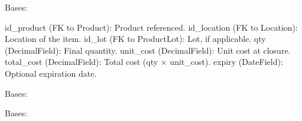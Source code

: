 \documentclass[a4paper,11pt,spanish]{sphinxmanual}
\begin{document}

\begin{fulllineitems}
\label{\detokenize{api/inventory/inventory.models:inventory.models.InventoryPeriodSnapshotItem}}
\pysigstartsignatures
\pysiglinewithargsret
{}
{\sphinxparamcomma {}}
{}
\pysigstopsignatures
\sphinxAtStartPar
Bases: 
\begin{description}
\sphinxAtStartPar
id\_product (FK to Product): Product referenced.
id\_location (FK to Location): Location of the item.
id\_lot (FK to ProductLot): Lot, if applicable.
qty (DecimalField): Final quantity.
unit\_cost (DecimalField): Unit cost at closure.
total\_cost (DecimalField): Total cost (qty × unit\_cost).
expiry (DateField): Optional expiration date.

\end{description}

\begin{fulllineitems}
\label{\detokenize{api/inventory/inventory.models:inventory.models.InventoryPeriodSnapshotItem.DoesNotExist}}
\pysigstartsignatures
\pysigline
{}
\pysigstopsignatures
\sphinxAtStartPar
Bases: 

\end{fulllineitems}


\begin{fulllineitems}
\label{\detokenize{api/inventory/inventory.models:inventory.models.InventoryPeriodSnapshotItem.MultipleObjectsReturned}}
\pysigstartsignatures
\pysigline
{}
\pysigstopsignatures
\sphinxAtStartPar
Bases: 


\end{fulllineitems}
\end{fulllineitems}
\end{document}
